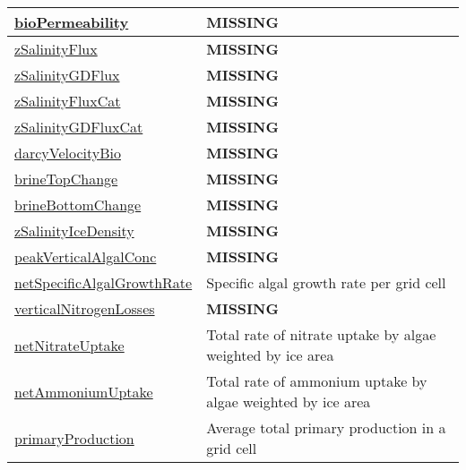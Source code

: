 {\begin{center}
\begin{longtable}{| p{2.0in} | p{4.0in} |}
    \hline
    \hyperref[subsec:var_sec_biogeochemistry_bioPermeability]{bioPermeability} & {\bf \color{red} MISSING} \\
    \hline
    \hyperref[subsec:var_sec_biogeochemistry_zSalinityFlux]{zSalinityFlux} & {\bf \color{red} MISSING} \\
    \hline
    \hyperref[subsec:var_sec_biogeochemistry_zSalinityGDFlux]{zSalinityGDFlux} & {\bf \color{red} MISSING} \\
    \hline
    \hyperref[subsec:var_sec_biogeochemistry_zSalinityFluxCat]{zSalinityFluxCat} & {\bf \color{red} MISSING} \\
    \hline
    \hyperref[subsec:var_sec_biogeochemistry_zSalinityGDFluxCat]{zSalinityGDFluxCat} & {\bf \color{red} MISSING} \\
    \hline
    \hyperref[subsec:var_sec_biogeochemistry_darcyVelocityBio]{darcyVelocityBio} & {\bf \color{red} MISSING} \\
    \hline
    \hyperref[subsec:var_sec_biogeochemistry_brineTopChange]{brineTopChange} & {\bf \color{red} MISSING} \\
    \hline
    \hyperref[subsec:var_sec_biogeochemistry_brineBottomChange]{brineBottomChange} & {\bf \color{red} MISSING} \\
    \hline
    \hyperref[subsec:var_sec_biogeochemistry_zSalinityIceDensity]{zSalinityIceDensity} & {\bf \color{red} MISSING} \\
    \hline
    \hyperref[subsec:var_sec_biogeochemistry_peakVerticalAlgalConc]{peakVerticalAlgalConc} & {\bf \color{red} MISSING} \\
    \hline
    \hyperref[subsec:var_sec_biogeochemistry_netSpecificAlgalGrowthRate]{netSpecificAlgalGrowthRate} & Specific algal growth rate per grid cell \\
    \hline
    \hyperref[subsec:var_sec_biogeochemistry_verticalNitrogenLosses]{verticalNitrogenLosses} & {\bf \color{red} MISSING} \\
    \hline
    \hyperref[subsec:var_sec_biogeochemistry_netNitrateUptake]{netNitrateUptake} & Total rate of nitrate uptake by algae weighted by ice area \\
    \hline
    \hyperref[subsec:var_sec_biogeochemistry_netAmmoniumUptake]{netAmmoniumUptake} & Total rate of ammonium uptake by algae weighted by ice area \\
    \hline
    \hyperref[subsec:var_sec_biogeochemistry_primaryProduction]{primaryProduction} & Average total primary production in a grid cell \\
    \hline

\end{longtable}
\end{center}}
